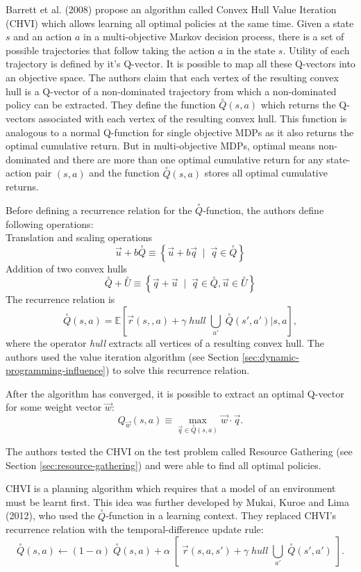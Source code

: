 Barrett et al. (2008) \nocite{barrett2008learning} propose an algorithm called Convex Hull Value Iteration (CHVI) which allows learning all optimal policies at the same time. Given a state $s$ and an action $a$ in a multi-objective Markov decision process, there is a set of possible trajectories that follow taking the action $a$ in the state $s$. Utility of each trajectory is defined by it's Q-vector. It is possible to map all these Q-vectors into an objective space. The authors claim that each vertex of the resulting convex hull is a Q-vector of a non-dominated trajectory from which a non-dominated policy can be extracted. They define the function $\overset{\circ}{Q}(s,a)$ which returns the Q-vectors associated with each vertex of the resulting convex hull. This function is analogous to a normal Q-function for single objective MDPs as it also returns the optimal cumulative return. But in multi-objective MDPs, optimal means non-dominated and there are more than one optimal cumulative return for any state-action pair $(s,a)$ and the function $\overset{\circ}{Q}(s,a)$ stores all optimal cumulative returns.

Before defining a recurrence relation for the $\overset{\circ}{Q}$-function, the authors define following operations:\\
Translation and scaling operations
$$ \vec{u}+b\overset{\circ}{Q}  \equiv \left\{ \vec{u} + b\vec{q} \;\;|\;\; \vec{q} \in \overset{\circ}{Q} \right\} $$
Addition of two convex hulls
$$ \overset{\circ}{Q} + \overset{\circ}{U} \equiv \left\{ \vec{q} + \vec{u} \;\;|\;\; \vec{q} \in \overset{\circ}{Q},\vec{u} \in \overset{\circ}{U} \right\} $$
The recurrence relation is
$$ \overset{\circ}{Q}(s,a) = \mathbb{E}\left[ \vec{r}(s,,a) + \gamma \; hull \; \underset{a'}{\bigcup} \; \overset{\circ}{Q}(s',a') | s,a \right], $$
where the operator \textit{hull} extracts all vertices of a resulting convex hull. The authors used the value iteration algorithm (see Section \ref{sec:dynamic-programming-influence}) to solve this recurrence relation.

After the algorithm has converged, it is possible to extract an optimal Q-vector for some weight vector $\vec{w}$:
$$ Q_{\vec{w}}(s,a) \equiv \underset{\vec{q}\in\overset{\circ}{Q}(s,a)}{\max} \vec{w} \cdot \vec{q}. $$

The authors tested the CHVI on the test problem called Resource Gathering (see Section \ref{sec:resource-gathering}) and were able to find all optimal policies.

CHVI is a planning algorithm which requires that a model of an environment must be learnt first. This idea was further developed by Mukai, Kuroe and Lima (2012)\nocite{Mukai2012}, who used the $\overset{\circ}{Q}$-function in a learning context. They replaced CHVI's recurrence relation with the temporal-difference update rule:
$$ \overset{\circ}{Q}(s,a) \leftarrow (1-\alpha)\;\overset{\circ}{Q}(s,a) + \alpha \; \left[\; \vec{r}(s,a,s') + \gamma \; hull \; \underset{a'}{\bigcup} \; \overset{\circ}{Q}(s',a')\;\right]. $$

